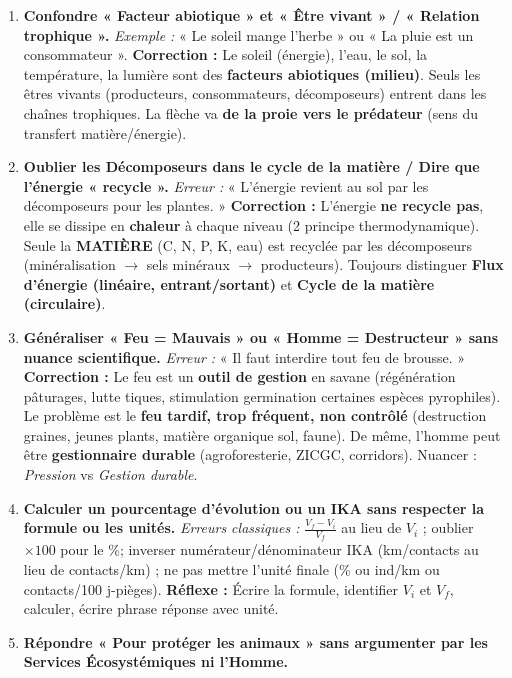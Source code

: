 \documentclass[11pt]{article}
\begin{document}
\begin{attention}
    \begin{enumerate}
        \item \textbf{Confondre « Facteur abiotique » et « Être vivant » / « Relation trophique ».}
              \textit{Exemple :} « Le soleil mange l'herbe » ou « La pluie est un consommateur ». \textbf{Correction :} Le soleil (énergie), l'eau, le sol, la température, la lumière sont des \textbf{facteurs abiotiques (milieu)}. Seuls les êtres vivants (producteurs, consommateurs, décomposeurs) entrent dans les chaînes trophiques. La flèche va \textbf{de la proie vers le prédateur} (sens du transfert matière/énergie).
        \item \textbf{Oublier les Décomposeurs dans le cycle de la matière / Dire que l'énergie « recycle ».}
              \textit{Erreur :} « L'énergie revient au sol par les décomposeurs pour les plantes. » \textbf{Correction :} L'énergie \textbf{ne recycle pas}, elle se dissipe en \textbf{chaleur} à chaque niveau (2 principe thermodynamique). Seule la \textbf{MATIÈRE} (C, N, P, K, eau) est recyclée par les décomposeurs (minéralisation $\rightarrow$ sels minéraux $\rightarrow$ producteurs). Toujours distinguer \textbf{Flux d'énergie (linéaire, entrant/sortant)} et \textbf{Cycle de la matière (circulaire)}.
        \item \textbf{Généraliser « Feu = Mauvais » ou « Homme = Destructeur » sans nuance scientifique.}
              \textit{Erreur :} « Il faut interdire tout feu de brousse. » \textbf{Correction :} Le feu est un \textbf{outil de gestion} en savane (régénération pâturages, lutte tiques, stimulation germination certaines espèces pyrophiles). Le problème est le \textbf{feu tardif, trop fréquent, non contrôlé} (destruction graines, jeunes plants, matière organique sol, faune). De même, l'homme peut être \textbf{gestionnaire durable} (agroforesterie, ZICGC, corridors). Nuancer : \textit{Pression} vs \textit{Gestion durable}.
        \item \textbf{Calculer un pourcentage d'évolution ou un IKA sans respecter la formule ou les unités.}
              \textit{Erreurs classiques :} $\frac{V_f - V_i}{V_f}$ au lieu de $V_i$ ; oublier $\times 100$ pour le \%; inverser numérateur/dénominateur IKA (km/contacts au lieu de contacts/km) ; ne pas mettre l'unité finale (\% ou ind/km ou contacts/100 j-pièges). \textbf{Réflexe :} Écrire la formule, identifier $V_i$ et $V_f$, calculer, écrire phrase réponse avec unité.
        \item \textbf{Répondre « Pour protéger les animaux » sans argumenter par les Services Écosystémiques ni l'Homme.}

\end{enumerate}
\end{attention}
\end{document}
